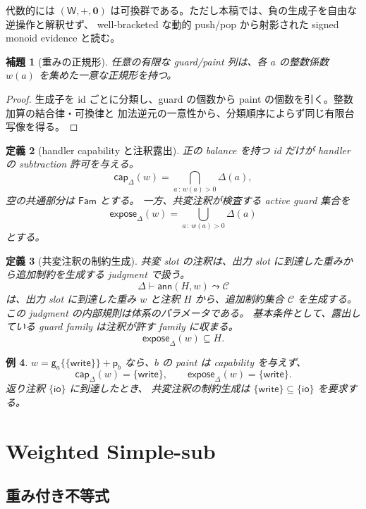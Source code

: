 \documentclass[uplatex,dvipdfmx,a4paper,11pt]{jsarticle}
\theoremstyle{jpplain}
\newtheorem{definition}{定義}[section]
\newtheorem{lemma}[definition]{補題}
\newtheorem{example}[definition]{例}
\newcommand{\Fam}{\mathsf{Fam}}
\newcommand{\gatom}[2]{\mathsf g_{#1}\!\{#2\}}
\newcommand{\patom}[1]{\mathsf p_{#1}}
\newcommand{\weight}{\mathsf W}
\newcommand{\annemit}{\mathsf{ann}}
\newcommand{\zeroW}{\mathbf 0}
\newcommand{\capW}[2]{\mathsf{cap}_{#1}(#2)}
\newcommand{\exposeW}[2]{\mathsf{expose}_{#1}(#2)}
\begin{document}
代数的には $(\weight,+,\zeroW)$ は可換群である。ただし本稿では、負の生成子を自由な逆操作と解釈せず、
well-bracketed な動的 push/pop から射影された signed monoid evidence と読む。

\begin{lemma}[重みの正規形]
任意の有限な guard/paint 列は、各 $a$ の整数係数 \(w(a)\) を集めた一意な正規形を持つ。
\end{lemma}
\begin{proof}
生成子を id ごとに分類し、guard の個数から paint の個数を引く。整数加算の結合律・可換律と
加法逆元の一意性から、分類順序によらず同じ有限台写像を得る。
\end{proof}

\begin{definition}[handler capability と注釈露出]
正の balance を持つ id だけが handler の subtraction 許可を与える。
\[
 \capW\Delta w
 = \bigcap_{a\,:\,w(a)>0}\Delta(a),
\]
空の共通部分は $\Fam$ とする。
一方、共変注釈が検査する active guard 集合を
\[
 \exposeW\Delta w
 = \bigcup_{a\,:\,w(a)>0}\Delta(a)
\]
とする。
\end{definition}

\begin{definition}[共変注釈の制約生成]
共変 slot の注釈は、出力 slot に到達した重みから追加制約を生成する judgment で扱う。
\[
  \Delta\vdash \annemit(H,w)\leadsto \mathcal C
\]
は、出力 slot に到達した重み \(w\) と注釈 \(H\) から、追加制約集合 \(\mathcal C\) を生成する。
この judgment の内部規則は体系のパラメータである。
基本条件として、露出している guard family は注釈が許す family に収まる。
\[
  \exposeW\Delta w\subseteq H.
\]
\end{definition}

\begin{example}
$w=\gatom a{\{\mathsf{write}\}}+\patom b$ なら、$b$ の paint は capability を与えず、
\[
 \capW\Delta w=\{\mathsf{write}\},\qquad
 \exposeW\Delta w=\{\mathsf{write}\}.
\]
返り注釈 $\{\mathsf{io}\}$ に到達したとき、
共変注釈の制約生成は $\{\mathsf{write}\}\subseteq\{\mathsf{io}\}$ を要求する。
\end{example}

\section{Weighted Simple-sub}

\subsection{重み付き不等式}
\end{document}

